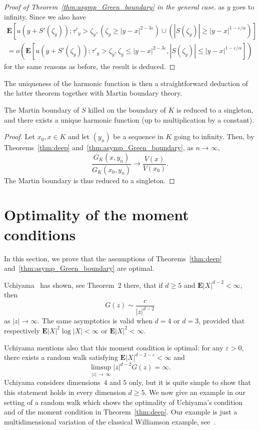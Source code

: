\documentclass[10pt]{amsart}
\theoremstyle{definition}\newtheorem{defi}[theo]{Definition}\newtheorem{rema}[theo]{Remark}\newtheorem{exam}[theo]{Example}\newtheorem{exem}[theo]{Example}\newtheorem{nota}[theo]{Notation}
\newcommand{\e}{\mathbf{E}}
\renewcommand{\epsilon}{\varepsilon}
\renewcommand{\ge}{\geqslant}
\renewcommand{\leq}{\leqslant}
\renewcommand{\geq}{\geqslant}
\begin{document}
\begin{proof}[Proof of Theorem~\ref{thm:asymp_Green_boundary} in the general case]
as $y$ goes to infinity. Since we also have
\begin{multline*}
\e\left[u\left(y+S'(\zeta_{y})\right);\tau'_{y}>\zeta_{y},\left(\zeta_{y}\geq |y-x|^{2-3\epsilon}\right)\cup\left(\left|S\left(\zeta_{y}\right)\right| \geq |y-x|^{1-\epsilon/\alpha}\right)\right]\\
=o\left(\e\left[u\left(y+S'(\zeta_{y})\right);\tau'_{y}>\zeta_{y},\zeta_{y}\leq |y-x|^{2-3\epsilon},\left|S(\zeta_{y})\right| \leq | y-x|^{1-\epsilon/\alpha}\right]\right)
\end{multline*}
for the same reasons as before, the result is deduced.
\end{proof}

The uniqueness of the harmonic function is then a straightforward deduction of the latter theorem together with Martin boundary theory.
\begin{coro}
The Martin boundary of $S$ killed on the boundary of ${K}$ is reduced to a singleton, and there exists a unique harmonic function (up to multiplication by a constant).
\end{coro}
\begin{proof}
Let $x_{0},x\in{K}$ and let $(y_{n})$ be a sequence in ${K}$ going to infinity. Then, by Theorems~\ref{thm:deep} and~\ref{thm:asymp_Green_boundary}, as $n\to \infty$,
\[
\frac{G_K(x,y_{n})}{G_K(x_{0},y_{n})}\to\frac{V(x)}{V(x_{0})}.
\]
The Martin boundary is thus reduced to a singleton.
\end{proof}


\section{Optimality of the moment conditions}\label{sec:optimal}

In this section, we prove that the assumptions of Theorems~\ref{thm:deep} and~\ref{thm:asymp_Green_boundary} are optimal.

Uchiyama~\cite{Uc-98} has shown, see Theorem~2 there, that if $d\ge 5$ and $\e| X|^{d-2}<\infty$, then
\[
G(z)\sim\frac{c}{|z|^{d-2}}
\]
as $| z|\to\infty$. The same asymptotics is valid when $d=4$ or $d=3$, provided that respectively $\e| X|^2\log| X|<\infty$ or $\e| X|^2<\infty$.

Uchiyama mentions also that this moment condition is optimal: for any $\varepsilon>0$, there exists a random walk satisfying $\e| X|^{d-2-\varepsilon}<\infty$ and
\[
\limsup_{|z|\,\to\,\infty}| z|^{d-2}G(z)=\infty.
\]
Uchiyama considers dimensions~$4$ and $5$ only, but it is quite simple to show that this statement holds in every dimension $d\ge5$. We now give an example in our setting of a random walk which shows the optimality of Uchiyama's condition and of the moment condition in Theorem~\ref{thm:deep}. Our example is just a multidimensional variation of the classical Williamson example, see~\cite{Wi-68}.
\end{document}
